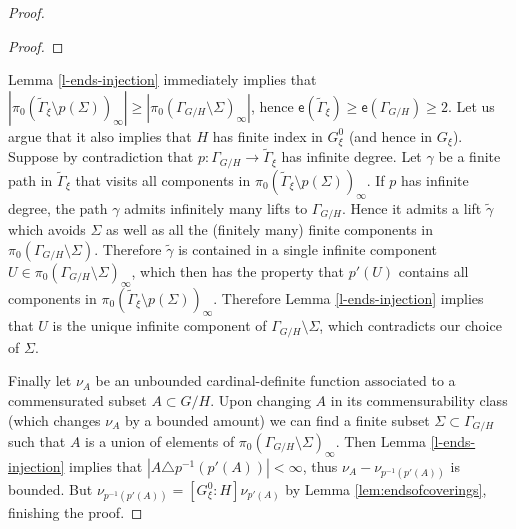 \documentclass[10pt,a4paper]{amsart}
\newcommand{\Gammatilde}{\ensuremath{\widetilde{\Gamma}}}%
\newcommand{\esf}{\ensuremath{\mathsf{e}}}
\begin{document}
\begin{proof}
\begin{proof}
\end{proof}

Lemma \ref{l-ends-injection} immediately implies that $|\pi_0(\Gammatilde_\xi\setminus p(\Sigma))_\infty|\ge |\pi_0(\Gamma_{G/H}\setminus \Sigma)_\infty|$,
hence $\esf(\Gammatilde_\xi)\ge\esf(\Gamma_{G/H})\ge 2$. Let us argue that it also implies that $H$ has finite index in $G^0_\xi$ (and hence in $G_\xi$). Suppose by contradiction that $p\colon \Gamma_{G/H}\to \Gammatilde_\xi$ has infinite degree. Let $\gamma$ be a finite path in $\Gammatilde_\xi$ that visits all components in $\pi_0(\Gammatilde_\xi\setminus p(\Sigma))_\infty$. If $p$ has infinite degree, the path $\gamma$ admits infinitely many lifts to $\Gamma_{G/H}$. Hence it admits a lift $\tilde{\gamma}$ which avoids $\Sigma$ as well as all the (finitely many) finite components in $\pi_0(\Gamma_{G/H}\setminus \Sigma)$.  Therefore $\tilde{\gamma}$ is contained in a single infinite component $U\in \pi_0(\Gamma_{G/H}\setminus \Sigma)_\infty$, which then has the property that $p'(U)$ contains all components in $\pi_0(\Gammatilde_\xi\setminus p(\Sigma))_\infty$. Therefore Lemma \ref{l-ends-injection} implies that $U$ is the unique infinite component of $\Gamma_{G/H}\setminus \Sigma$, which contradicts our choice of $\Sigma$.

Finally let $\nu_A$ be an unbounded cardinal-definite function associated to a commensurated subset $A\subset G/H$. Upon changing $A$ in its commensurability class (which changes $\nu_A$ by a bounded amount) we can find a finite subset $\Sigma\subset \Gamma_{G/H}$ such that $A$ is a union of elements of $\pi_0(\Gamma_{G/H}\setminus \Sigma)_
\infty$. Then Lemma \ref{l-ends-injection} implies that  $|A\triangle p^{-1}(p'(A))|<\infty$, thus $\nu_A-\nu_{p^{-1}(p'(A))}$ is bounded. But $\nu_{p^{-1}(p'(A))}=[G^0_\xi \colon H]\nu_{p'(A)}$ by Lemma \ref{lem:endsofcoverings}, finishing the proof. \qedhere

\end{proof}
\end{document}
